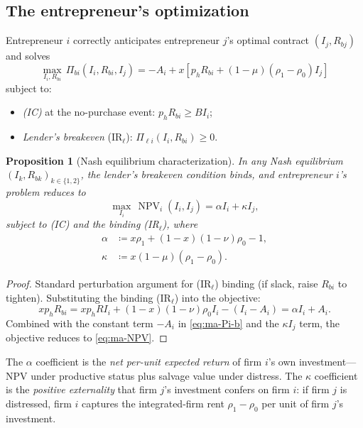 \documentclass[11pt,a4paper,oneside]{book}
\def\geq{\geqslant}
\DeclareMathOperator{\NPV}{NPV}
\theoremstyle{plain}
\newtheorem{proposition}[theorem]{Proposition}
\theoremstyle{definition}
\theoremstyle{remark}
\numberwithin{equation}{chapter}
\begin{document}
\subsection{The entrepreneur's optimization}

Entrepreneur $i$ correctly anticipates entrepreneur $j$'s optimal contract $(I_j, R_{b j})$ and solves
\begin{equation*}
  \max_{I_i, R_{b i}} \, \Pi_{b i}(I_i, R_{b i}, I_j) = -A_i + x \left[ p_h R_{b i} + (1 - \mu)(\rho_1 - \rho_0) I_j \right]
\end{equation*}
subject to:
\begin{itemize}
  \item \emph{(IC)} at the no-purchase event: $p_h R_{b i} \geq B I_i$;
  \item \emph{Lender's breakeven} (IR$_\ell$): $\Pi_{\ell i}(I_i, R_{b i}) \geq 0$.
\end{itemize}

\begin{proposition}[Nash equilibrium characterization]\label{prop:ma-NE}
In any Nash equilibrium $(I_k, R_{b k})_{k \in \{1, 2\}}$, the lender's breakeven condition binds, and entrepreneur $i$'s problem reduces to
\begin{equation}\label{eq:ma-NPV}
  \max_{I_i} \, \NPV_i(I_i, I_j) = \alpha I_i + \kappa I_j,
\end{equation}
subject to \textup{(IC)} and the binding \textup{(IR$_\ell$)}, where
\begin{align}\label{eq:ma-alpha-kappa}
  \alpha &\coloneqq x \rho_1 + (1 - x)(1 - \nu) \rho_0 - 1, \\
  \kappa &\coloneqq x(1 - \mu)(\rho_1 - \rho_0).
\end{align}
\end{proposition}

\begin{proof}
Standard perturbation argument for (IR$_\ell$) binding (if slack, raise $R_{b i}$ to tighten).
Substituting the binding (IR$_\ell$) into the objective:
\begin{equation*}
  x p_h R_{b i} = x p_h R I_i + (1 - x)(1 - \nu) \rho_0 I_i - (I_i - A_i) = \alpha I_i + A_i.
\end{equation*}
Combined with the constant term $-A_i$ in \eqref{eq:ma-Pi-b} and the $\kappa I_j$ term, the objective reduces to \eqref{eq:ma-NPV}.
\end{proof}

The $\alpha$ coefficient is the \emph{net per-unit expected return} of firm $i$'s own investment---NPV under productive status plus salvage value under distress.
The $\kappa$ coefficient is the \emph{positive externality} that firm $j$'s investment confers on firm $i$: if firm $j$ is distressed, firm $i$ captures the integrated-firm rent $\rho_1 - \rho_0$ per unit of firm $j$'s investment.
\end{document}
